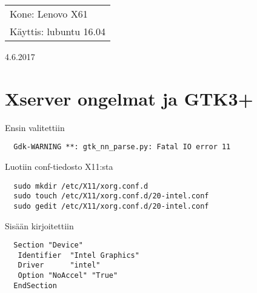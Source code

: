 \documentclass[main.tex]{subfiles}
\begin{document}
\thispagestyle{empty}
\begin{tabular}[t]{l}
Kone: Lenovo X61\\
Käyttis: lubuntu 16.04
\end{tabular}
\hfill 4.6.2017

\section{Xserver ongelmat ja GTK3+}

Ensin valitettiin

\begin{lstlisting}
  Gdk-WARNING **: gtk_nn_parse.py: Fatal IO error 11
\end{lstlisting}

Luotiin conf-tiedosto X11:sta

\begin{lstlisting}
  sudo mkdir /etc/X11/xorg.conf.d
  sudo touch /etc/X11/xorg.conf.d/20-intel.conf
  sudo gedit /etc/X11/xorg.conf.d/20-intel.conf
\end{lstlisting}

Sisään kirjoitettiin

\begin{lstlisting}
  Section "Device"
   Identifier  "Intel Graphics"
   Driver      "intel"
   Option "NoAccel" "True"
  EndSection
\end{lstlisting}
\end{document}
